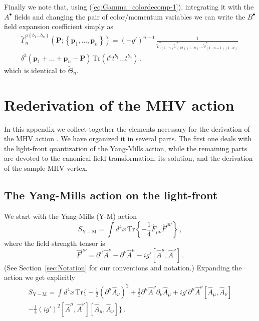 \documentclass[english,american]{article}
\begin{document}
Finally we note that, using (\ref{eq:Gamma_colordecomp-1}), integrating
it with the $A^{\bullet}$ fields and changing the pair of color/momentum
variables we can write the $B^{\bullet}$ field expansion coefficient
simply as
\begin{multline}
\tilde{\Gamma}_{n}^{a\left\{ b_{1}\dots b_{n}\right\} }\left(\mathbf{P};\left\{ \mathbf{p}_{1},\dots,\mathbf{p}_{n}\right\} \right)=\left(-g'\right)^{n-1}\,\frac{1}{\tilde{v}_{1\left(1\dots n\right)}^{*}\tilde{v}_{\left(12\right)\left(1\dots n\right)}^{*}\dots\tilde{v}_{\left(1\dots n-1\right)\left(1\dots n\right)}^{*}}\,\\
\delta^{3}\left(\mathbf{p}_{1}+\dots+\mathbf{p}_{n}-\mathbf{P}\right)\,\mathrm{Tr}\left(t^{a}t^{b_{1}}\dots t^{b_{n}}\right)\,.\label{eq:Gamma_solution}
\end{multline}
which is identical to $\tilde{\Theta}_{n}$.


\section{Rederivation of the MHV action}

\label{sec:App_MHVaction}

In this appendix we collect together the elements  necessary for the derivation of the MHV action \citep{Mansfield2006}.
 We have organized it in several parts. The first
one deals with the light-front quantization of the Yang-Mills action,
while the remaining parts are devoted to the canonical field transformation,
its solution, and the derivation of  the sample MHV vertex. 


\subsection{The Yang-Mills action on the light-front}

We start with the Yang-Mills (Y-M) action
\begin{equation}
S_{\mathrm{Y-M}}=\int d^{4}x\,\mathrm{Tr}\left\{ -\frac{1}{4}\hat{F}_{\mu\nu}\hat{F}^{\mu\nu}\right\} \,,
\end{equation}
where the field strength tensor is
\begin{equation}
\hat{F}^{\mu\nu}=\partial^{\mu}\hat{A}^{\nu}-\partial^{\nu}\hat{A}^{\mu}-ig'\left[\hat{A}^{\mu},\hat{A}^{\nu}\right]\,.
\end{equation}
(See Section~\ref{sec:Notation} for our conventions and notation.)
Expanding the action we get explicitly
\begin{multline}
S_{\mathrm{Y-M}}=\int d^{4}x\,\mathrm{Tr}\Bigg\{-\frac{1}{2}\left(\partial^{\mu}\hat{A}_{\nu}\right)^{2}+\frac{1}{2}\partial^{\mu}\hat{A}^{\nu}\partial_{\nu}\hat{A}_{\mu}+ig'\partial^{\mu}\hat{A}^{\nu}\left[\hat{A}_{\mu},\hat{A}_{\nu}\right]\\
-\frac{1}{4}\left(ig'\right)^{2}\left[\hat{A}^{\mu},\hat{A}^{\nu}\right]\left[\hat{A}_{\mu},\hat{A}_{\nu}\right]\Bigg\}\,.\label{eq:YM_action_explicit}
\end{multline}
\end{document}
